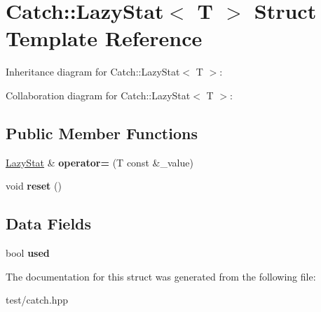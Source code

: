 \hypertarget{structCatch_1_1LazyStat}{}\section{Catch\+:\+:Lazy\+Stat$<$ T $>$ Struct Template Reference}
\label{structCatch_1_1LazyStat}


Inheritance diagram for Catch\+:\+:Lazy\+Stat$<$ T $>$\+:


Collaboration diagram for Catch\+:\+:Lazy\+Stat$<$ T $>$\+:
\subsection*{Public Member Functions}
\begin{DoxyCompactItemize}
\item 
\hyperlink{structCatch_1_1LazyStat}{Lazy\+Stat} \& {\bfseries operator=} (T const \&\+\_\+value)\hypertarget{structCatch_1_1LazyStat_af8e1c0c8b1b1975a515b190618f25b31}{}\label{structCatch_1_1LazyStat_af8e1c0c8b1b1975a515b190618f25b31}

\item 
void {\bfseries reset} ()\hypertarget{structCatch_1_1LazyStat_a535947bbc846868903cc960e747d9e03}{}\label{structCatch_1_1LazyStat_a535947bbc846868903cc960e747d9e03}

\end{DoxyCompactItemize}
\subsection*{Data Fields}
\begin{DoxyCompactItemize}
\item 
bool {\bfseries used}\hypertarget{structCatch_1_1LazyStat_a3f68d716a1e972df47dc43b4d402124a}{}\label{structCatch_1_1LazyStat_a3f68d716a1e972df47dc43b4d402124a}

\end{DoxyCompactItemize}


The documentation for this struct was generated from the following file\+:\begin{DoxyCompactItemize}
\item 
test/catch.\+hpp\end{DoxyCompactItemize}
